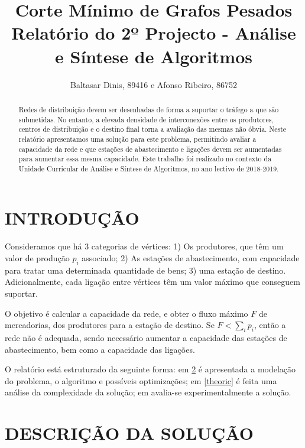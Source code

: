 \documentclass[a4paper, 12pt, conference, portuguese]{ieeeconf}
\title{{\LARGE \bf Corte Mínimo de Grafos Pesados\\}
\large{Relatório do 2º Projecto - Análise e Síntese de Algoritmos} }
\author{Baltasar Dinis, 89416 e Afonso Ribeiro, 86752}
\begin{document}
\newtheorem{theorem}{Teorema}
\theoremstyle{definition}
\newtheorem{axiom}{Axioma}[section]
\newtheorem{corollary}{Corolário}
\newtheorem{lemma}{Lema}
\newtheorem{defin}{Definição}
\newtheorem*{dem}{Demonstração}

\maketitle
\thispagestyle{empty}
\pagestyle{empty}

\begin{abstract}
  Redes de distribuição devem ser desenhadas de forma a
  suportar o tráfego a que são submetidas. No entanto, a
  elevada densidade de interconexões entre os produtores,
  centros de distribuição e o destino final torna a avaliação das
  mesmas não óbvia. Neste relatório apresentamos uma solução
  para este problema, permitindo avaliar a capacidade da rede e
  que estações de abastecimento e ligações devem ser aumentadas
  para aumentar essa mesma capacidade. Este trabalho foi
  realizado no contexto da Unidade Curricular de Análise e Síntese
  de Algoritmos, no ano lectivo de 2018-2019.
\end{abstract}

\section{INTRODUÇÃO}\label{intro}

Consideramos que há $3$ categorias de vértices: 1) Os produtores,
que têm um valor de produção $p_i$ associado; 2) As
estações de abastecimento, com capacidade para tratar
uma determinada quantidade de bens; 3) uma estação de destino.
Adicionalmente, cada ligação entre vértices têm um valor máximo
que conseguem suportar.

O objetivo é calcular a capacidade da rede, e obter o fluxo
máximo $F$ de mercadorias, dos produtores para a estação de
destino. Se $F < \sum_i p_i$, então a rede não é adequada, sendo
necessário aumentar a capacidade das estações de abastecimento,
bem como a capacidade das ligações.

O relatório está estruturado da seguinte forma: em \ref{sol} é
apresentada a modelação do problema, o algoritmo e possíveis
optimizações; em \ref{theoric} é feita uma análise da
complexidade da solução; em \label{experimental} avalia-se
experimentalmente a solução.

\section{DESCRIÇÃO DA SOLUÇÃO}\label{sol}
\end{document}

